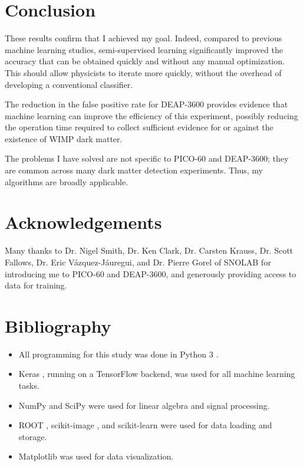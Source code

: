 \documentclass[12pt]{article}
\begin{document}
\section{Conclusion}

These results confirm that I achieved my goal. Indeed, compared to previous machine learning studies, semi-supervised learning significantly improved the accuracy that can be obtained quickly and without any manual optimization. This should allow physicists to iterate more quickly, without the overhead of developing a conventional classifier.

The reduction in the false positive rate for DEAP-3600 provides evidence that machine learning can improve the efficiency of this experiment, possibly reducing the operation time required to collect sufficient evidence for or against the existence of WIMP dark matter.

The problems I have solved are not specific to PICO-60 and DEAP-3600; they are common across many dark matter detection experiments. Thus, my algorithms are broadly applicable.

\section{Acknowledgements}

Many thanks to Dr. Nigel Smith, Dr. Ken Clark, Dr. Carsten Krauss, Dr. Scott Fallows, Dr. Eric V\'azquez-J\'auregui, and Dr. Pierre Gorel of SNOLAB for introducing me to PICO-60 and DEAP-3600, and generously providing access to data for training.

\singlespacing
\printbibliography
\doublespacing

\section*{Bibliography}

\begin{itemize}
    \item All programming for this study was done in Python 3 \cite{python}.
    \item Keras \cite{keras}, running on a TensorFlow \cite{tensorflow} backend, was used for all machine learning tasks.
    \item NumPy \cite{numpy} and SciPy \cite{scipy} were used for linear algebra and signal processing.
    \item ROOT \cite{root}, scikit-image \cite{scikit-image}, and scikit-learn \cite{scikit-learn} were used for data loading and storage.
    \item Matplotlib \cite{matplotlib} was used for data visualization.
\end{itemize}
\end{document}
